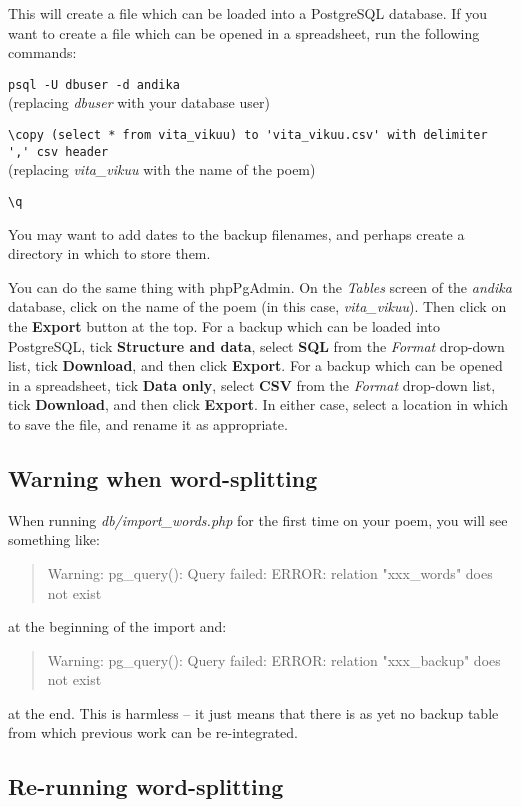 This will create a file which can be loaded into a PostgreSQL database.  If you want to create a file which can be opened in a spreadsheet, run the following commands:

\verb|psql -U dbuser -d andika|\\
(replacing \textit{dbuser} with your database user)

\verb|\copy (select * from vita_vikuu) to 'vita_vikuu.csv' with delimiter ',' csv header|\\
(replacing \textit{vita_vikuu} with the name of the poem)

\verb|\q|

You may want to add dates to the backup filenames, and perhaps create a directory in which to store them.

You can do the same thing with phpPgAdmin.  On the \textit{Tables} screen of the \textit{andika} database, click on the name of the poem (in this case, \textit{vita_vikuu}).  Then click on the \textbf{Export} button at the top.  For a backup which can be loaded into PostgreSQL, tick \textbf{Structure and data}, select \textbf{SQL} from the \textit{Format} drop-down list, tick \textbf{Download}, and then click \textbf{Export}.  For a backup which can be opened in a spreadsheet, tick \textbf{Data only}, select \textbf{CSV} from the \textit{Format} drop-down list, tick \textbf{Download}, and then click \textbf{Export}.  In either case, select a location in which to save the file, and rename it as appropriate.

\subsection{Warning when word-splitting}

When running \textit{db/import_words.php} for the first time on your poem, you will see something like:
\begin{quotation}
\noindent Warning: pg_query(): Query failed: ERROR:  relation "xxx_words" does not exist\\
\end{quotation}
at the beginning of the import and:
\begin{quotation}
\noindent Warning: pg_query(): Query failed: ERROR:  relation "xxx_backup" does not exist
\end{quotation}
at the end.  This is harmless -- it just means that there is as yet no backup table from which previous work can be re-integrated.

\subsection{Re-running word-splitting}
\label{ss:rerun}

